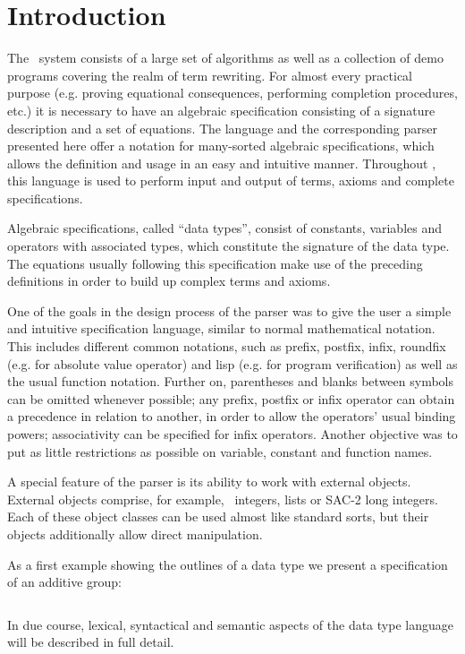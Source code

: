 \section{Introduction}

The \redux\ system consists of a large set of algorithms as well as a collection of demo
programs covering the realm of term rewriting. For almost every practical purpose
(e.g. proving equational consequences, performing completion procedures, etc.)
it is necessary to
have an algebraic specification consisting of a signature description
and a set of equations. The language and the corresponding parser presented here
offer a notation for many-sorted algebraic specifications, which allows the
definition and usage in an easy and intuitive manner.
Throughout \redux, this language is used to perform input and output of
terms, axioms and complete specifications.

Algebraic specifications, called ``data types'', consist of constants, variables
and operators with associated types, which constitute the signature of the
data type. The equations usually following this specification make use of the
preceding definitions in order to build up complex terms and axioms.

One of the goals in the design process of the parser was to give the user a
simple and intuitive specification language, similar to normal mathematical notation.
This includes different common notations, such as prefix, postfix, infix, roundfix
(e.g. for absolute value operator) and lisp (e.g. for program verification) as well
as the usual function notation.
Further on, parentheses and blanks between symbols can be omitted whenever possible;
any prefix, postfix or infix operator can obtain a precedence in relation to another,
in order to allow the operators' usual binding powers; associativity can be specified
for infix operators.
Another objective was to put as little restrictions as possible on variable,
constant and function names.

A special feature of the parser is its ability to work with external objects.
External objects comprise, for example, \ALDES\ integers, 
lists or SAC-2 long integers.
Each of these object classes can be used almost like standard sorts, but
their objects additionally allow direct manipulation.

As a first example showing the outlines of a data type we present  
a specification of an additive group:

\begin{example}
$ $ 
\end{example}

In due course, lexical, syntactical and semantic aspects of the data type 
language will be described in full detail.
